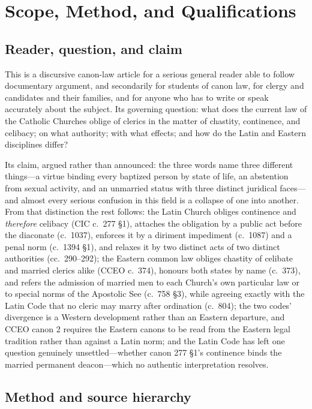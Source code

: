 \section{Scope, Method, and Qualifications}

\subsection{Reader, question, and claim}

This is a discursive canon-law article for a serious general reader able to follow documentary argument, and secondarily for students of canon law, for clergy and candidates and their families, and for anyone who has to write or speak accurately about the subject. Its governing question: what does the current law of the Catholic Churches oblige of clerics in the matter of chastity, continence, and celibacy; on what authority; with what effects; and how do the Latin and Eastern disciplines differ?

Its claim, argued rather than announced: the three words name three different things---a virtue binding every baptized person by state of life, an abstention from sexual activity, and an unmarried status with three distinct juridical faces---and almost every serious confusion in this field is a collapse of one into another. From that distinction the rest follows: the Latin Church obliges continence and \emph{therefore} celibacy (CIC c.~277 §1), attaches the obligation by a public act before the diaconate (c.~1037), enforces it by a diriment impediment (c.~1087) and a penal norm (c.~1394 §1), and relaxes it by two distinct acts of two distinct authorities (cc.~290--292); the Eastern common law obliges chastity of celibate and married clerics alike (CCEO c.~374), honours both states by name (c.~373), and refers the admission of married men to each Church's own particular law or to special norms of the Apostolic See (c.~758 §3), while agreeing exactly with the Latin Code that no cleric may marry after ordination (c.~804); the two codes' divergence is a Western development rather than an Eastern departure, and CCEO canon 2 requires the Eastern canons to be read from the Eastern legal tradition rather than against a Latin norm; and the Latin Code has left one question genuinely unsettled---whether canon 277 §1's continence binds the married permanent deacon---which no authentic interpretation resolves.

\subsection{Method and source hierarchy}

